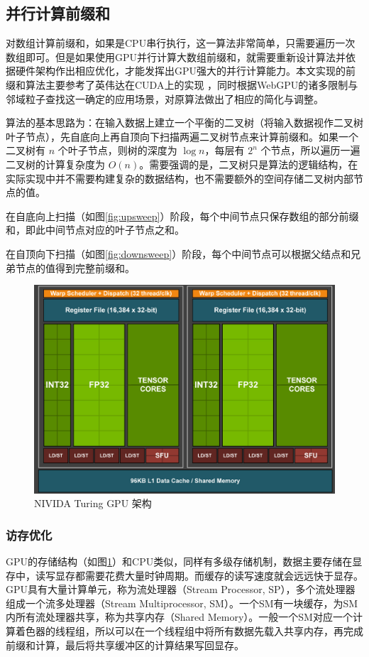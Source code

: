 \subsection{并行计算前缀和}
    对数组计算前缀和，如果是CPU串行执行，这一算法非常简单，只需要遍历一次数组即可。但是如果使用GPU并行计算大数组前缀和，就需要重新设计算法并依据硬件架构作出相应优化，才能发挥出GPU强大的并行计算能力。本文实现的前缀和算法主要参考了英伟达在CUDA上的实现\cite{HSO07SCAN} ，同时根据WebGPU的诸多限制与邻域粒子查找这一确定的应用场景，对原算法做出了相应的简化与调整。
    
    算法的基本思路为：在输入数据上建立一个平衡的二叉树（将输入数据视作二叉树叶子节点），先自底向上再自顶向下扫描两遍二叉树节点来计算前缀和。如果一个二叉树有 $n$ 个叶子节点，则树的深度为 $\log n$，每层有 $2^n$ 个节点，所以遍历一遍二叉树的计算复杂度为 $O(n)$。需要强调的是，二叉树只是算法的逻辑结构，在实际实现中并不需要构建复杂的数据结构，也不需要额外的空间存储二叉树内部节点的值。
    
    在自底向上扫描（如图\ref{fig:upsweep}）阶段，每个中间节点只保存数组的部分前缀和，即此中间节点对应的叶子节点之和。
    
    在自顶向下扫描（如图\ref{fig:downsweep}）阶段，每个中间节点可以根据父结点和兄弟节点的值得到完整前缀和。

    \begin{figure}
    	\centering
    	\includegraphics[width=.6\textwidth]{figures/neighbor/sm_cut.png}
    	\caption{NIVIDA Turing GPU 架构\cite{NV18Truing}}
    	\label{fig:turing}
    \end{figure}

\subsubsection{访存优化}
    GPU的存储结构（如图\ref{fig:turing}）和CPU类似，同样有多级存储机制，数据主要存储在显存中，读写显存都需要花费大量时钟周期。而缓存的读写速度就会远远快于显存。GPU具有大量计算单元，称为流处理器（Stream Processor, SP），多个流处理器组成一个流多处理器（Stream Multiprocessor, SM）。一个SM有一块缓存，为SM内所有流处理器共享，称为共享内存（Shared Memory）。一般一个SM对应一个计算着色器的线程组，所以可以在一个线程组中将所有数据先载入共享内存，再完成前缀和计算，最后将共享缓冲区的计算结果写回显存。

